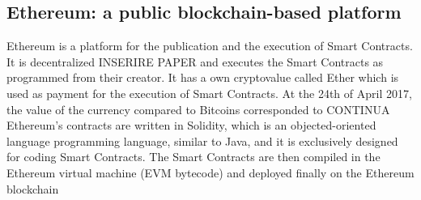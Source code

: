 






\subsection{Ethereum: a public blockchain-based platform}
Ethereum is a platform for the publication and the execution of Smart Contracts. It is decentralized INSERIRE PAPER and executes the Smart Contracts as programmed from their creator.
It has a own cryptovalue called Ether which is used as payment for the execution of Smart Contracts.
At the 24th of April 2017, the value of the currency compared to Bitcoins corresponded to CONTINUA
Ethereum's contracts are written in Solidity, which is an objected-oriented language programming language, similar to Java, and it is exclusively designed for coding Smart Contracts.
The Smart Contracts are then compiled in the Ethereum virtual machine (EVM bytecode) and deployed finally on the Ethereum blockchain 

